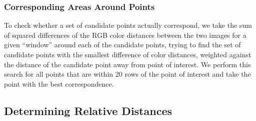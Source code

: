\subsubsection{Corresponding Areas Around Points}
To check whether a set of candidate points actually correspond, we take the sum of squared differences of the RGB color distances between the two images for a given ``window'' around each of the candidate points, trying to find the set of candidate points with the smallest difference of color distances, weighted against the distance of the candidate point away from point of interest. We perform this search for all points that are within 20 rows of the point of interest and take the point with the best correspondence. 

\subsection{Determining Relative Distances}